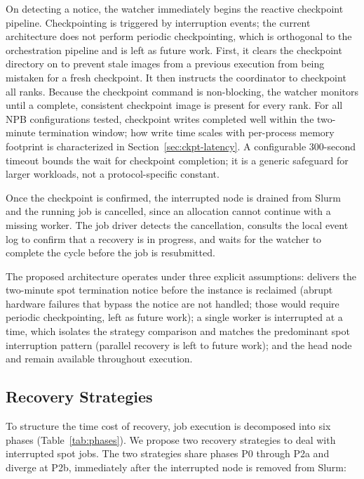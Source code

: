 \documentclass[conference]{IEEEtran}
\begin{document}
On detecting a notice, the watcher immediately begins the reactive checkpoint pipeline.
Checkpointing is triggered by interruption events; the current architecture does
not perform periodic checkpointing, which is orthogonal to the orchestration pipeline
and is left as future work.
First, it clears the checkpoint directory on \EFS to prevent stale images from a
previous execution from being mistaken for a fresh checkpoint.
It then instructs the \MANA coordinator to checkpoint all \MPI ranks.
Because the checkpoint command is non-blocking, the watcher monitors \EFS until a
complete, consistent checkpoint image is present for every rank.
For all NPB configurations tested, checkpoint writes completed well within the
two-minute termination window; how write time scales with per-process memory footprint
is characterized in Section~\ref{sec:ckpt-latency}.
A configurable 300-second timeout bounds the wait for checkpoint completion; it is a
generic safeguard for larger workloads, not a protocol-specific constant.

Once the checkpoint is confirmed, the interrupted node is drained from Slurm and
the running job is cancelled, since an allocation cannot continue with a missing worker.
The job driver detects the cancellation, consults the local event log to confirm that
a recovery is in progress, and waits for the watcher to complete the cycle before
the job is resubmitted.

The proposed architecture operates under three explicit assumptions: \AWS delivers the two-minute spot
termination notice before the instance is reclaimed (abrupt hardware failures that
bypass the notice are not handled; those would require periodic checkpointing, left as
future work); a single worker is interrupted at a time, which isolates the strategy
comparison and matches the predominant spot interruption pattern (parallel recovery is
left to future work); and the head node and \EFS remain available throughout execution.

\subsection{Recovery Strategies}
\label{sec:strategies}

To structure the time cost of recovery, job execution is decomposed into six phases
(Table~\ref{tab:phases}). We propose two recovery strategies to deal with interrupted
\MPI spot jobs. The two strategies share phases P0 through P2a and diverge at P2b,
immediately after the interrupted node is removed from Slurm:
\end{document}
